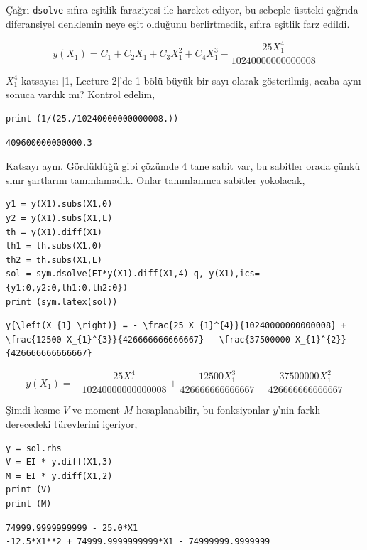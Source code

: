 \documentclass[12pt,fleqn]{article}\usepackage{../../common}
\begin{document}
Çağrı \verb!dsolve! sıfıra eşitlik faraziyesi ile hareket ediyor, bu sebeple
üstteki çağrıda diferansiyel denklemin neye eşit olduğunu berlirtmedik, sıfıra
eşitlik farz edildi.

$$
y{\left(X_{1} \right)} = C_{1} + C_{2} X_{1} + C_{3} X_{1}^{2} + C_{4} X_{1}^{3} - \frac{25 X_{1}^{4}}{10240000000000008}
$$

$X_1^4$ katsayısı [1, Lecture 2]'de 1 bölü büyük bir sayı olarak gösterilmiş,
acaba aynı sonuca vardık mı? Kontrol edelim,

\begin{verbatim}
print (1/(25./10240000000000008.))
\end{verbatim}

\begin{verbatim}
409600000000000.3
\end{verbatim}

Katsayı aynı. Gördüldüğü gibi çözümde 4 tane sabit var, bu sabitler orada çünkü
sınır şartlarını tanımlamadık. Onlar tanımlanınca sabitler yokolacak,

\begin{verbatim}
y1 = y(X1).subs(X1,0)
y2 = y(X1).subs(X1,L)
th = y(X1).diff(X1)
th1 = th.subs(X1,0)
th2 = th.subs(X1,L)
sol = sym.dsolve(EI*y(X1).diff(X1,4)-q, y(X1),ics={y1:0,y2:0,th1:0,th2:0})
print (sym.latex(sol))
\end{verbatim}

\begin{verbatim}
y{\left(X_{1} \right)} = - \frac{25 X_{1}^{4}}{10240000000000008} + \frac{12500 X_{1}^{3}}{426666666666667} - \frac{37500000 X_{1}^{2}}{426666666666667}
\end{verbatim}

$$
y{\left(X_{1} \right)} = - \frac{25 X_{1}^{4}}{10240000000000008} + \frac{12500 X_{1}^{3}}{426666666666667} - \frac{37500000 X_{1}^{2}}{426666666666667}
$$

Şimdi kesme $V$ ve moment $M$ hesaplanabilir, bu fonksiyonlar $y$'nin farklı
derecedeki türevlerini içeriyor, 

\begin{verbatim}
y = sol.rhs
V = EI * y.diff(X1,3)
M = EI * y.diff(X1,2)
print (V)
print (M)
\end{verbatim}

\begin{verbatim}
74999.9999999999 - 25.0*X1
-12.5*X1**2 + 74999.9999999999*X1 - 74999999.9999999
\end{verbatim}
\end{document}
